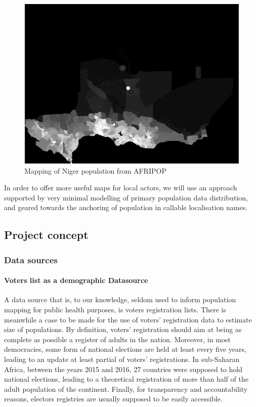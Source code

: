 \begin{figure}
	\includegraphics[width=15cm]{figure/WORLDPOP_Niger.png}
	\caption{Mapping of Niger population from AFRIPOP}
\end{figure}

In order to offer more useful maps for local actors, we will use an approach supported by very minimal modelling of primary population data distribution, and geared towards the anchoring of population in callable localisation names.

\subsection{Project concept}

\subsubsection{Data sources}

\paragraph{Voters list as a demographic Datasource} A data source that is, to our knowledge, seldom used to inform population mapping for public health purposes, is voters registration lists. There is meanwhile a case to be made for the use of voters' registration data to estimate size of populations. By definition, voters' registration should aim at being as complete as possible a register of adults in the nation. Moreover, in most democracies, some form of national elections are held at least  every five years, leading to an update at least partial of voters' registrations. In sub-Saharan Africa, between the years 2015 and 2016, 27 countries were supposed to hold national elections, leading to a theoretical registration of more than half of the adult population of the continent. Finally, for transparency and accountability reasons, electors registries are usually supposed to be easily accessible.

